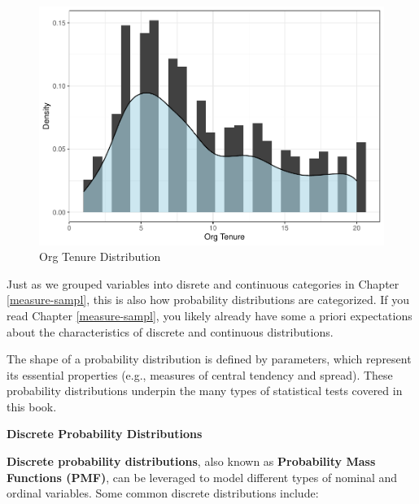 \documentclass[]{book}
\begin{document}
\begin{figure}

{\centering \includegraphics{People_Analytics_Lifecycle_files/figure-latex/org-tenure-dist-1} 

}

\caption{Org Tenure Distribution}\label{fig:org-tenure-dist}
\end{figure}

Just as we grouped variables into disrete and continuous categories in Chapter \ref{measure-sampl}, this is also how probability distributions are categorized. If you read Chapter \ref{measure-sampl}, you likely already have some a priori expectations about the characteristics of discrete and continuous distributions.

The shape of a probability distribution is defined by parameters, which represent its essential properties (e.g., measures of central tendency and spread). These probability distributions underpin the many types of statistical tests covered in this book.

\textbf{Discrete Probability Distributions}

\textbf{Discrete probability distributions}, also known as \textbf{Probability Mass Functions (PMF)}, can be leveraged to model different types of nominal and ordinal variables. Some common discrete distributions include:
\end{document}
